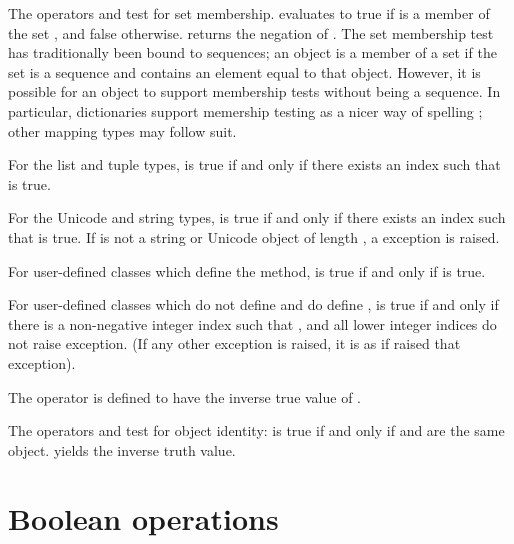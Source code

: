 The operators  and  test for set
membership.   evaluates to true if 
is a member of the set , and false otherwise.   returns the negation of .
The set membership test has traditionally been bound to sequences; an
object is a member of a set if the set is a sequence and contains an
element equal to that object.  However, it is possible for an object
to support membership tests without being a sequence.  In particular,
dictionaries support memership testing as a nicer way of spelling
; other mapping types may follow suit.

For the list and tuple types,  is true if and
only if there exists an index  such that
 is true.

For the Unicode and string types,  is true if
and only if there exists an index  such that  is true. If  is not a string or
Unicode object of length , a  exception
is raised.

For user-defined classes which define the  method,
 is true if and only if
 is true.

For user-defined classes which do not define  and
do define ,  is true if
and only if there is a non-negative integer index  such that
, and all lower integer indices
do not raise  exception. (If any other exception
is raised, it is as if  raised that exception).

The operator  is defined to have the inverse true value
of .

The operators  and  test for object identity:
 is true if and only if  and 
are the same object.   yields the inverse
truth value.


\section{Boolean operations\label{Booleans}}

